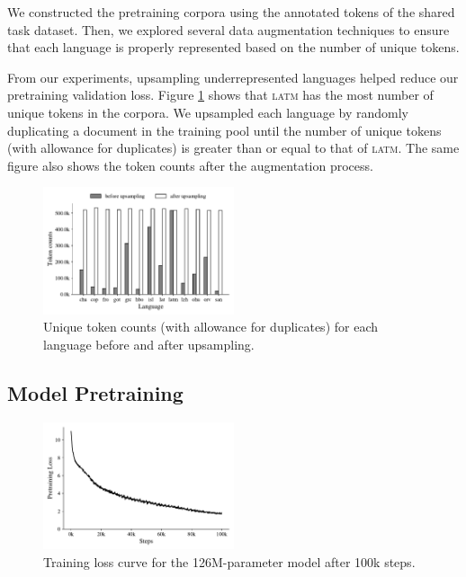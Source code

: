 \documentclass[11pt]{article}
\begin{document}
We constructed the pretraining corpora using the annotated tokens of the shared task dataset.
Then, we explored several data augmentation techniques to ensure that each language is properly represented based on the number of unique tokens.

From our experiments, upsampling underrepresented languages helped reduce our pretraining validation loss.
Figure \ref{fig:unique_tokens} shows that \textsc{latm} has the most number of unique tokens in the corpora.
We upsampled each language by randomly duplicating a document in the training pool until the number of unique tokens (with allowance for duplicates) is greater than or equal to that of \textsc{latm}.
The same figure also shows the token counts after the augmentation process.

\begin{figure}[t]
\centering
\includegraphics[width=0.5\textwidth]{figures/token_counts.pdf}
\caption{Unique token counts (with allowance for duplicates) for each language before and after upsampling.}
\label{fig:unique_tokens}
\end{figure}

\subsection{Model Pretraining}

\begin{figure}[t]
\centering
\includegraphics[width=0.5\textwidth]{figures/train_loss.pdf}
\caption{Training loss curve for the 126M-parameter model after 100k steps.}
\label{fig:training_curve}
\end{figure}
\end{document}
